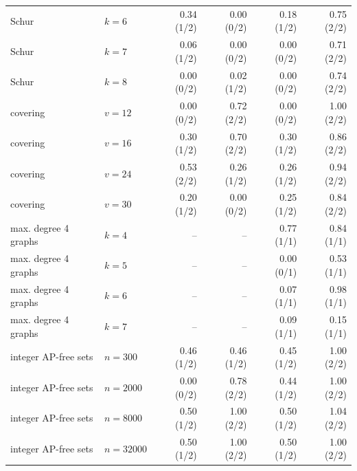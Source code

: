 \begin{longtable}{@{}P{.23\linewidth}lrrrr@{}}
Schur & $k=6$ & 0.34 (1/2) & 0.00 (0/2) & 0.18 (1/2) & 0.75 (2/2) \\
Schur & $k=7$ & 0.06 (1/2) & 0.00 (0/2) & 0.00 (0/2) & 0.71 (2/2) \\
Schur & $k=8$ & 0.00 (0/2) & 0.02 (1/2) & 0.00 (0/2) & 0.74 (2/2) \\
covering & $v=12$ & 0.00 (0/2) & 0.72 (2/2) & 0.00 (0/2) & 1.00 (2/2) \\
covering & $v=16$ & 0.30 (1/2) & 0.70 (2/2) & 0.30 (1/2) & 0.86 (2/2) \\
covering & $v=24$ & 0.53 (2/2) & 0.26 (1/2) & 0.26 (1/2) & 0.94 (2/2) \\
covering & $v=30$ & 0.20 (1/2) & 0.00 (0/2) & 0.25 (1/2) & 0.84 (2/2) \\
max. degree 4 graphs & $k=4$ & -- & -- & 0.77 (1/1) & 0.84 (1/1) \\
max. degree 4 graphs & $k=5$ & -- & -- & 0.00 (0/1) & 0.53 (1/1) \\
max. degree 4 graphs & $k=6$ & -- & -- & 0.07 (1/1) & 0.98 (1/1) \\
max. degree 4 graphs & $k=7$ & -- & -- & 0.09 (1/1) & 0.15 (1/1) \\
integer AP-free sets & $n=300$ & 0.46 (1/2) & 0.46 (1/2) & 0.45 (1/2) & 1.00 (2/2) \\
integer AP-free sets & $n=2000$ & 0.00 (0/2) & 0.78 (2/2) & 0.44 (1/2) & 1.00 (2/2) \\
integer AP-free sets & $n=8000$ & 0.50 (1/2) & 1.00 (2/2) & 0.50 (1/2) & 1.04 (2/2) \\
integer AP-free sets & $n=32000$ & 0.50 (1/2) & 1.00 (2/2) & 0.50 (1/2) & 1.00 (2/2) \\
\end{longtable}
